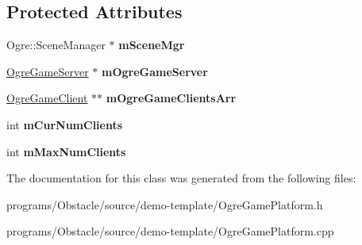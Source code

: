 \subsection*{Protected Attributes}
\begin{DoxyCompactItemize}
\item 
Ogre\+::\+Scene\+Manager $\ast$ {\bfseries m\+Scene\+Mgr}\hypertarget{classns__phys_1_1_ogre_game_platform_a99c5716eaf98789d5bd13c2f5946276b}{}\label{classns__phys_1_1_ogre_game_platform_a99c5716eaf98789d5bd13c2f5946276b}

\item 
\hyperlink{classns__phys_1_1_ogre_game_server}{Ogre\+Game\+Server} $\ast$ {\bfseries m\+Ogre\+Game\+Server}\hypertarget{classns__phys_1_1_ogre_game_platform_ad98c2de2d527ad0852fa6860e1829725}{}\label{classns__phys_1_1_ogre_game_platform_ad98c2de2d527ad0852fa6860e1829725}

\item 
\hyperlink{classns__phys_1_1_ogre_game_client}{Ogre\+Game\+Client} $\ast$$\ast$ {\bfseries m\+Ogre\+Game\+Clients\+Arr}\hypertarget{classns__phys_1_1_ogre_game_platform_a998d06dcfc91a4acfa4165e9c5518722}{}\label{classns__phys_1_1_ogre_game_platform_a998d06dcfc91a4acfa4165e9c5518722}

\item 
int {\bfseries m\+Cur\+Num\+Clients}\hypertarget{classns__phys_1_1_ogre_game_platform_ad1cee98e3fc879f3f6d23d6bfa7b9205}{}\label{classns__phys_1_1_ogre_game_platform_ad1cee98e3fc879f3f6d23d6bfa7b9205}

\item 
int {\bfseries m\+Max\+Num\+Clients}\hypertarget{classns__phys_1_1_ogre_game_platform_a4775e65b27355268d771dbc344b6b4d9}{}\label{classns__phys_1_1_ogre_game_platform_a4775e65b27355268d771dbc344b6b4d9}

\end{DoxyCompactItemize}


The documentation for this class was generated from the following files\+:\begin{DoxyCompactItemize}
\item 
programs/\+Obstacle/source/demo-\/template/Ogre\+Game\+Platform.\+h\item 
programs/\+Obstacle/source/demo-\/template/Ogre\+Game\+Platform.\+cpp\end{DoxyCompactItemize}
